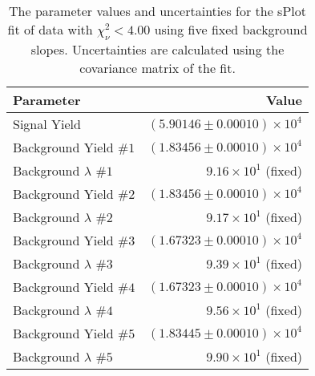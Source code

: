 
\begin{table}[ht]
    \begin{center}
        \begin{tabular}{lr}\toprule
            Parameter & Value \\\midrule
            Signal Yield & $(5.90146 \pm 0.00010) \times 10^{4}$ \\
            Background Yield $\#1$ & $(1.83456 \pm 0.00010) \times 10^{4}$ \\
            Background $\lambda$ $\#1$ & $9.16 \times 10^{1}$ (fixed) \\
            Background Yield $\#2$ & $(1.83456 \pm 0.00010) \times 10^{4}$ \\
            Background $\lambda$ $\#2$ & $9.17 \times 10^{1}$ (fixed) \\
            Background Yield $\#3$ & $(1.67323 \pm 0.00010) \times 10^{4}$ \\
            Background $\lambda$ $\#3$ & $9.39 \times 10^{1}$ (fixed) \\
            Background Yield $\#4$ & $(1.67323 \pm 0.00010) \times 10^{4}$ \\
            Background $\lambda$ $\#4$ & $9.56 \times 10^{1}$ (fixed) \\
            Background Yield $\#5$ & $(1.83445 \pm 0.00010) \times 10^{4}$ \\
            Background $\lambda$ $\#5$ & $9.90 \times 10^{1}$ (fixed) \\\bottomrule
        \end{tabular}
        \caption{The parameter values and uncertainties for the sPlot fit of data with $\chi^2_\nu < 4.00$ using five fixed background slopes. Uncertainties are calculated using the covariance matrix of the fit.}\label{tab:splot-fit-results-chisqdof-4.00-fixed-5}
    \end{center}
\end{table}
